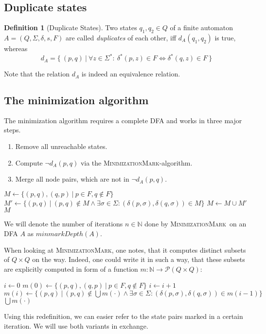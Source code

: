 \documentclass[a4paper, oneside, 11pt]{report}
\theoremstyle{definition}
\newtheorem{definition}{Definition}
\theoremstyle{remark}
\newcommand{\MinMark}{\textsc{MinimizationMark}}
\begin{document}
\subsection{Duplicate states}

\begin{definition}[Duplicate States]
	Two states $q_1, q_2 \in Q$ of a finite automaton $A = (Q, \Sigma, \delta, s, F)$ are called \emph{duplicates} of each other, iff $d_A(q_1, q_2)$ is true, whereas
	\[
		d_A = \{\ (p, q)\ |\ \forall z \in \Sigma^* \colon\ \delta^*(p, z) \in F \Leftrightarrow \delta^*(q, z) \in F\ \}
	\]
\end{definition}
Note that the relation $d_A$ is indeed an equivalence relation.

\subsection{The minimization algorithm}

The minimization algorithm requires a complete DFA and works in three major steps.
\begin{enumerate}
	\item Remove all unreachable states.
	\item Compute $\neg d_A(p, q)$ via the \MinMark-algorithm.
	\item Merge all node pairs, which are not in $\neg d_A(p, q)$.
\end{enumerate}

\begin{algorithmic}[1]
	\State $M \gets \{ (p,q), (q,p)\ |\ p \in F, q \notin F \}$
	\Do
		\State $M' \gets \{ (p,q)\ |\ (p,q) \notin M \land \exists \sigma \in \Sigma \colon (\delta(p,\sigma), \delta(q,\sigma)) \in M \}$
		\State $M \gets M \cup M'$
	\State \Return $M$
	\EndFunction
\end{algorithmic}
\vspace{0.2cm}
We will denote the number of iterations $n \in \mathbb{N}$ done by \MinMark\ on an DFA $A$ as $minmarkDepth(A)$.

When looking at \MinMark, one notes, that it computes distinct subsets of $Q \times Q$ on the way. Indeed, one could write it in such a way, that these subsets are explicitly computed in form of a function $m\colon\mathbb{N}\to\mathcal{P}(Q\times Q)$:
\vspace{0.2cm}
\begin{algorithmic}[1]
	\State $i \gets 0$
	\State $m(0) \gets \{ (p,q), (q,p)\ |\ p \in F, q \notin F \}$
	\Do
		\State $i \gets i + 1$
		\State $m(i) \gets \{ (p,q)\ |\ (p,q) \notin \bigcup{m(\cdot)} \land \exists \sigma \in \Sigma \colon (\delta(p,\sigma), \delta(q,\sigma)) \in m(i-1) \}$
	\State \Return $\bigcup{m(\cdot)}$
	\EndFunction
\end{algorithmic}
\vspace{0.2cm}
Using this redefinition, we can easier refer to the state pairs marked in a certain iteration. We will use both variants in exchange.
\end{document}
